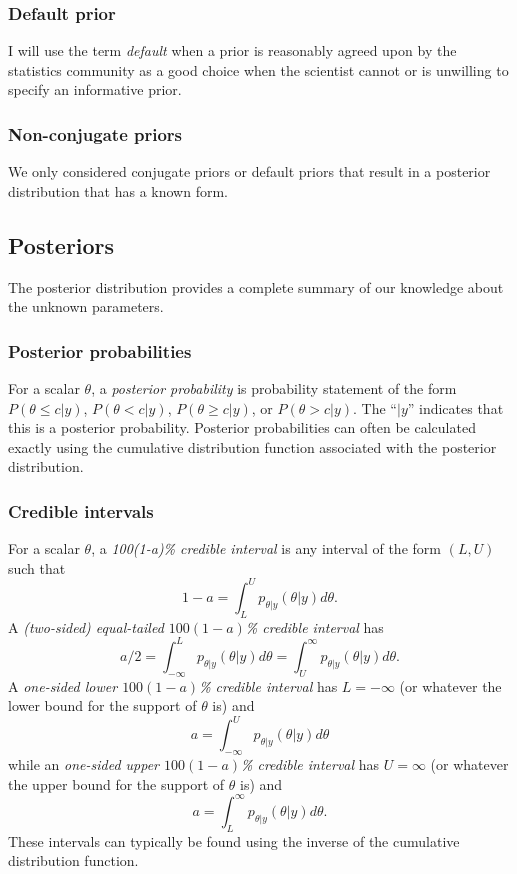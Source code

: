 \subsubsection{Default prior}

I will use the term \emph{default} when a prior is reasonably agreed upon by the
statistics community as a good choice when the scientist cannot or is unwilling
to specify an informative prior.


\subsubsection{Non-conjugate priors}

We only considered conjugate priors or default priors that result in a 
posterior distribution that has a known form.


\subsection{Posteriors}

The posterior distribution provides a complete summary of our knowledge about
the unknown parameters.

\subsubsection{Posterior probabilities}

For a scalar $\theta$, 
a \emph{posterior probability} is probability statement of the form
$P(\theta\le c|y)$, 
$P(\theta< c|y)$, 
$P(\theta\ge c|y)$, or
$P(\theta> c|y)$.
The ``$|y$'' indicates that this is a posterior probability.
Posterior probabilities can often be calculated exactly using the cumulative
distribution function associated with the posterior distribution. 


\subsubsection{Credible intervals}

For a scalar $\theta$,
a \emph{100(1-a)\% credible interval} is any interval of the form $(L,U)$ such 
that 
\[ 
1-a = \int_L^U p_{\theta|y}(\theta|y) d\theta.
\]
A \emph{(two-sided) equal-tailed $100(1-a)$\% credible interval} has 
\[ 
a/2 
= \int_{-\infty}^L p_{\theta|y}(\theta|y) d\theta 
= \int_U^\infty    p_{\theta|y}(\theta|y) d\theta.
\]
A \emph{one-sided lower $100(1-a)$\% credible interval} has $L=-\infty$ 
(or whatever the lower bound for the support of $\theta$ is) and
\[ 
a = \int_{-\infty}^U p_{\theta|y}(\theta|y) d\theta 
\]
while an \emph{one-sided upper $100(1-a)$\% credible interval} has $U=\infty$ 
(or whatever the upper bound for the support of $\theta$ is) and
\[ 
a = \int_L^\infty p_{\theta|y}(\theta|y) d\theta.
\]
These intervals can typically be found using the inverse of the cumulative 
distribution function.


